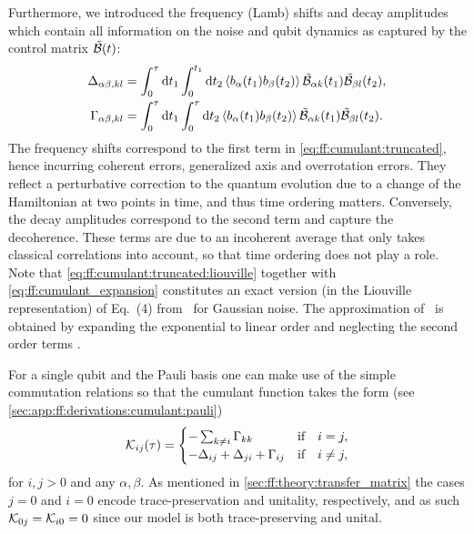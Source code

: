 Furthermore, we introduced the frequency (Lamb) shifts \freqshifts and decay amplitudes \decayamps which contain all information on the noise and qubit dynamics as captured by the control matrix $\tilde{\mathcal{B}}(t)$:
\begin{align}
    \Delta_{\alpha\beta,kl} &= \int_0^\tau\dd{t_1}\int_0^{t_1}\dd{t_2}\expval{b_\alpha(t_1) b_\beta(t_2)}\tilde{\mathcal{B}}_{\alpha k}(t_1)\tilde{\mathcal{B}}_{\beta l}(t_2), \label{eq:ff:frequency_shift:time} \\
    \Gamma_{\alpha\beta,kl} &= \int_0^\tau\dd{t_1}\int_0^\tau\dd{t_2}\expval{b_\alpha(t_1) b_\beta(t_2)}\tilde{\mathcal{B}}_{\alpha k}(t_1)\tilde{\mathcal{B}}_{\beta l}(t_2).  \label{eq:ff:decay_amplitudes:time}
\end{align}
The frequency shifts \freqshifts correspond to the first term in \cref{eq:ff:cumulant:truncated}, hence incurring coherent errors, \ie generalized axis and overrotation errors.
They reflect a perturbative correction to the quantum evolution due to a change of the Hamiltonian at two points in time, and thus time ordering matters.
Conversely, the decay amplitudes \decayamps correspond to the second term and capture the decoherence.
These terms are due to an incoherent average that only takes classical correlations into account, so that time ordering does not play a role.
Note that \cref{eq:ff:cumulant:truncated:liouville} together with \cref{eq:ff:cumulant_expansion} constitutes an exact version (in the Liouville representation) of Eq.~(4) from~ for Gaussian noise.
The approximation of~ is obtained by expanding the exponential to linear order and neglecting the second order terms \freqshifts.

For a single qubit and \basis the Pauli basis one can make use of the simple commutation relations so that the cumulant function takes the form (see \cref{sec:app:ff:derivations:cumulant:pauli})
\begin{equation}\label{eq:ff:cumulant:truncated:liouville:pauli}
\cumulantfun_{ij}(\tau) = \begin{cases}
                              - \sum_{k\neq i}\decayamps_{kk}                         &\qif* i = j,   \\
                              - \freqshifts_{ij} + \freqshifts_{ji} + \decayamps_{ij} &\qif* i\neq j,
\end{cases}
\end{equation}
for $i,j > 0$ and any $\alpha,\beta$.
As mentioned in \cref{sec:ff:theory:transfer_matrix} the cases $j = 0$ and $i = 0$ encode trace-preservation and unitality, respectively, and as such $\mathcal{K}_{0j} = \mathcal{K}_{i0} = 0$ since our model is both trace-preserving and unital.

